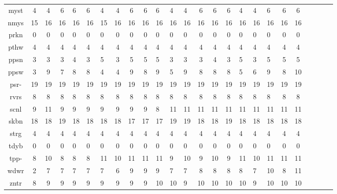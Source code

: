 \begin{center}
\begin{tabular}{|c|cccHHH|cccHHH|cccHHH|cccHHH|}
myst & 4 & 4 & 6 & 6 & 6 & 4 & 4 & 6 & 6 & 6 & 4 & 4 & 6 & 6 & 6 & 4 & 4 & 6 & 6 & 6\\
nmys & 15 & 16 & 16 & 16 & 16 & 15 & 16 & 16 & 16 & 16 & 16 & 16 & 16 & 16 & 16 & 16 & 16 & 16 & 16 & 16\\
prkn & 0 & 0 & 0 & 0 & 0 & 0 & 0 & 0 & 0 & 0 & 0 & 0 & 0 & 0 & 0 & 0 & 0 & 0 & 0 & 0\\
pthw & 4 & 4 & 4 & 4 & 4 & 4 & 4 & 4 & 4 & 4 & 4 & 4 & 4 & 4 & 4 & 4 & 4 & 4 & 4 & 4\\
ppsn & 3 & 3 & 3 & 4 & 3 & 5 & 3 & 5 & 5 & 5 & 3 & 3 & 3 & 4 & 3 & 5 & 3 & 5 & 5 & 5\\
ppsw & 3 & 9 & 7 & 8 & 8 & 4 & 4 & 9 & 8 & 9 & 5 & 9 & 8 & 8 & 8 & 5 & 6 & 9 & 8 & 10\\
psr- & 19 & 19 & 19 & 19 & 19 & 19 & 19 & 19 & 19 & 19 & 19 & 19 & 19 & 19 & 19 & 19 & 19 & 19 & 19 & 19\\
rvrs & 8 & 8 & 8 & 8 & 8 & 8 & 8 & 8 & 8 & 8 & 8 & 8 & 8 & 8 & 8 & 8 & 8 & 8 & 8 & 8\\
scnl & 9 & 11 & 9 & 9 & 9 & 9 & 9 & 9 & 9 & 8 & 11 & 11 & 11 & 11 & 11 & 11 & 11 & 11 & 11 & 11\\
skbn & 18 & 18 & 19 & 18 & 18 & 18 & 18 & 17 & 17 & 17 & 19 & 19 & 18 & 18 & 19 & 18 & 18 & 18 & 18 & 18\\
strg & 4 & 4 & 4 & 4 & 4 & 4 & 4 & 4 & 4 & 4 & 4 & 4 & 4 & 4 & 4 & 4 & 4 & 4 & 4 & 4\\
tdyb & 0 & 0 & 0 & 0 & 0 & 0 & 0 & 0 & 0 & 0 & 0 & 0 & 0 & 0 & 0 & 0 & 0 & 0 & 0 & 0\\
tpp- & 8 & 10 & 8 & 8 & 8 & 11 & 10 & 11 & 11 & 11 & 9 & 10 & 9 & 10 & 9 & 11 & 10 & 11 & 11 & 11\\
wdwr & 2 & 7 & 7 & 7 & 7 & 7 & 6 & 9 & 9 & 9 & 7 & 7 & 8 & 8 & 8 & 8 & 7 & 10 & 8 & 11\\
zntr & 8 & 9 & 9 & 9 & 9 & 9 & 9 & 9 & 9 & 10 & 10 & 9 & 10 & 10 & 10 & 10 & 9 & 10 & 10 & 10\\
\end{tabular}
\end{center}

